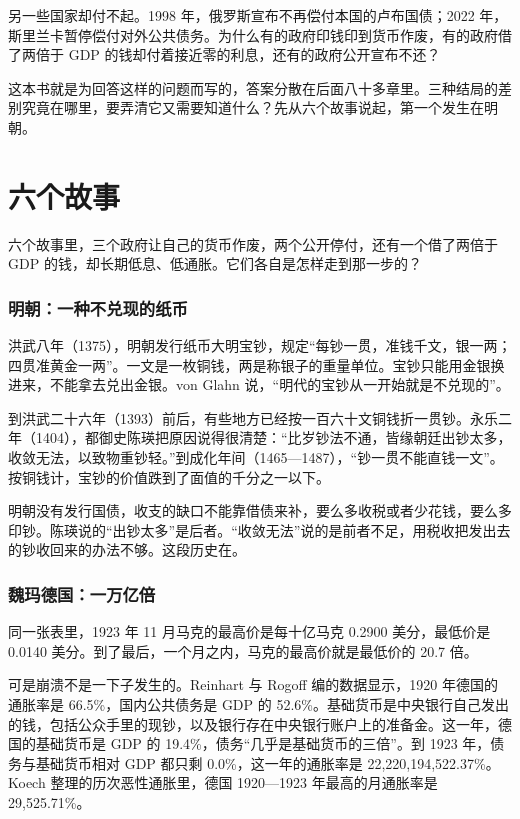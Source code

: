 另一些国家却付不起。1998 年，俄罗斯宣布不再偿付本国的卢布国债；2022 年，斯里兰卡暂停偿付对外公共债务。为什么有的政府印钱印到货币作废，有的政府借了两倍于 GDP 的钱却付着接近零的利息，还有的政府公开宣布不还？

这本书就是为回答这样的问题而写的，答案分散在后面八十多章里。三种结局的差别究竟在哪里，要弄清它又需要知道什么？先从六个故事说起，第一个发生在明朝。

\section{六个故事}\label{sec:intro-world}

六个故事里，三个政府让自己的货币作废，两个公开停付，还有一个借了两倍于 GDP 的钱，却长期低息、低通胀。它们各自是怎样走到那一步的？

\subsubsection{明朝：一种不兑现的纸币}
洪武八年（1375），明朝发行纸币大明宝钞，规定“每钞一贯，准钱千文，银一两；四贯准黄金一两”\cite{mingshi}。一文是一枚铜钱，两是称银子的重量单位。宝钞只能用金银换进来，不能拿去兑出金银。von Glahn 说，“明代的宝钞从一开始就是不兑现的”\cite{vonglahn1996}。

到洪武二十六年（1393）前后，有些地方已经按一百六十文铜钱折一贯钞。永乐二年（1404），都御史陈瑛把原因说得很清楚：“比岁钞法不通，皆缘朝廷出钞太多，收敛无法，以致物重钞轻。”到成化年间（1465—1487），“钞一贯不能直钱一文”\cite{mingshi}。按铜钱计，宝钞的价值跌到了面值的千分之一以下。

明朝没有发行国债，收支的缺口不能靠借债来补，要么多收税或者少花钱，要么多印钞。陈瑛说的“出钞太多”是后者。“收敛无法”说的是前者不足，用税收把发出去的钞收回来的办法不够。这段历史在。

\subsubsection{魏玛德国：一万亿倍}
同一张表里，1923 年 11 月马克的最高价是每十亿马克 0.2900 美分，最低价是 0.0140 美分。到了最后，一个月之内，马克的最高价就是最低价的 20.7 倍\cite{frb1924}。

可是崩溃不是一下子发生的。Reinhart 与 Rogoff 编的数据显示，1920 年德国的通胀率是 66.5\%，国内公共债务是 GDP 的 52.6\%。基础货币是中央银行自己发出的钱，包括公众手里的现钞，以及银行存在中央银行账户上的准备金。这一年，德国的基础货币是 GDP 的 19.4\%，债务“几乎是基础货币的三倍”。到 1923 年，债务与基础货币相对 GDP 都只剩 0.0\%，这一年的通胀率是 22,220,194,522.37\%\cite{reinhart2008}。Koech 整理的历次恶性通胀里，德国 1920—1923 年最高的月通胀率是 29,525.71\%\cite{koech2011}。

